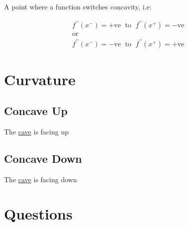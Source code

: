 \documentclass[12pt letter]{report}
\begin{document}
A point where a function switches concavity, i.e:

\begin{gather*}
	f^{\prime\prime}(x^{-}) = +\text{ve } \; \text{to } \; f^{\prime\prime}(x^{+}) = -\text{ve }\\
	\text{or } \\
	f^{\prime\prime}(x^{-}) = -\text{ve } \; \text{to } \; f^{\prime\prime}(x^{+}) = +\text{ve }
\end{gather*}

\section{Curvature}
\subsection{Concave Up}
The \underline{cave} is facing up

\subsection{Concave Down}
The \underline{cave} is facing down

\pagebreak

\section{Questions}
\end{document}
